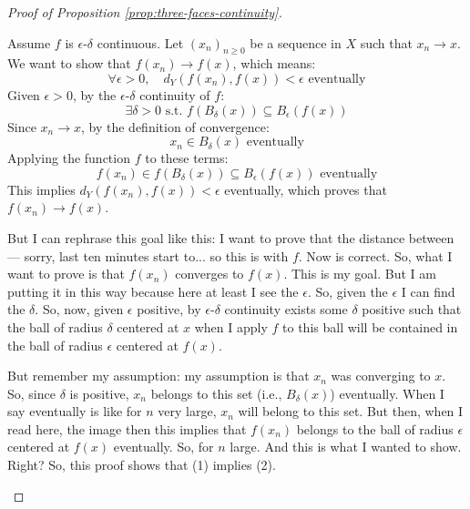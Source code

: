\begin{proof}[Proof of Proposition \ref{prop:three-faces-continuity}]
\begin{math-stroke}[Forward Implication \texorpdfstring{$(1) \implies (2)$}{(1) => (2)}]
\begin{ai-proof-skeleton-invisible-content}
\end{ai-proof-skeleton-invisible-content}
Assume $f$ is $\epsilon$-$\delta$ continuous. Let $(x_n)_{n \ge 0}$ be a sequence in $X$ such that $x_n \to x$.
We want to show that $f(x_n) \to f(x)$, which means:
\[ \forall \epsilon > 0, \quad d_Y(f(x_n), f(x)) < \epsilon \text{ eventually} \]
Given $\epsilon > 0$, by the $\epsilon$-$\delta$ continuity of $f$:
\[ \exists \delta > 0 \text{ s.t. } f(B_\delta(x)) \subseteq B_\epsilon(f(x)) \]
Since $x_n \to x$, by the definition of convergence:
\[ x_n \in B_\delta(x) \text{ eventually} \]
Applying the function $f$ to these terms:
\[ f(x_n) \in f(B_\delta(x)) \subseteq B_\epsilon(f(x)) \text{ eventually} \]
This implies $d_Y(f(x_n), f(x)) < \epsilon$ eventually, which proves that $f(x_n) \to f(x)$.
\end{math-stroke}

\begin{spoken-clean}[00:16:35 - 00:18:12]
But I can rephrase this goal like this: I want to prove that the distance between --- sorry, last ten minutes start to... so this is with $f$. Now is correct. So, what I want to prove is that $f(x_n)$ converges to $f(x)$. This is my goal. But I am putting it in this way because here at least I see the $\epsilon$. So, given the $\epsilon$ I can find the $\delta$. So, now, given $\epsilon$ positive, by $\epsilon$-$\delta$ continuity exists some $\delta$ positive such that the ball of radius $\delta$ centered at $x$ when I apply $f$ to this ball will be contained in the ball of radius $\epsilon$ centered at $f(x)$.
\end{spoken-clean}

\begin{spoken-clean}[00:18:12 - 00:19:50]
But remember my assumption: my assumption is that $x_n$ was converging to $x$. So, since $\delta$ is positive, $x_n$ belongs to this set (i.e., $B_\delta(x)$) eventually. When I say eventually is like for $n$ very large, $x_n$ will belong to this set. But then, when I read here, the image then this implies that $f(x_n)$ belongs to the ball of radius $\epsilon$ centered at $f(x)$ eventually. So, for $n$ large. And this is what I wanted to show. Right? So, this proof shows that (1) implies (2).
\end{spoken-clean}


\end{proof}
